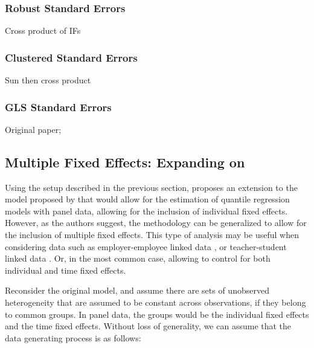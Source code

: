 \documentclass[
  authoryear,
  preprint,
  1p]{elsarticle}
\begin{document}
\hypertarget{robust-standard-errors}{%
\subsubsection{Robust Standard Errors}\label{robust-standard-errors}}

Cross product of IFs

\hypertarget{clustered-standard-errors}{%
\subsubsection{Clustered Standard
Errors}\label{clustered-standard-errors}}

Sun then cross product

\hypertarget{gls-standard-errors}{%
\subsubsection{GLS Standard Errors}\label{gls-standard-errors}}

Original paper;

\hypertarget{multiple-fixed-effects-expanding-on-mss2019}{%
\subsection{\texorpdfstring{Multiple Fixed Effects: Expanding on
\citet{mss2019}}{Multiple Fixed Effects: Expanding on @mss2019}}\label{multiple-fixed-effects-expanding-on-mss2019}}

Using the setup described in the previous section, \citet{mss2019}
proposes an extension to the model proposed by \citet{he1997} that would
allow for the estimation of quantile regression models with panel data,
allowing for the inclusion of individual fixed effects. However, as the
authors suggest, the methodology can be generalized to allow for the
inclusion of multiple fixed effects. This type of analysis may be useful
when considering data such as employer-employee linked data
\citep{abowed2006}, or teacher-student linked data
\citep{harrissass2011}. Or, in the most common case, allowing to control
for both individual and time fixed effects.

Reconsider the original model, and assume there are sets of unobserved
heterogeneity that are assumed to be constant across observations, if
they belong to common groups. In panel data, the groups would be the
individual fixed effects and the time fixed effects. Without loss of
generality, we can assume that the data generating process is as
follows:
\end{document}
